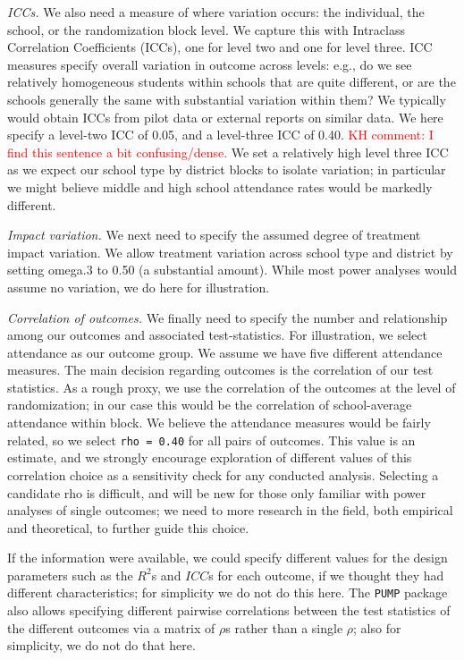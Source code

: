 \documentclass[
]{article}
\begin{document}
\emph{ICCs.} We also need a measure of where variation occurs: the
individual, the school, or the randomization block level. We capture
this with Intraclass Correlation Coefficients (ICCs), one for level two
and one for level three. ICC measures specify overall variation in
outcome across levels: e.g., do we see relatively homogeneous students
within schools that are quite different, or are the schools generally
the same with substantial variation within them? We typically would
obtain ICCs from pilot data or external reports on similar data. We here
specify a level-two ICC of 0.05, and a level-three ICC of 0.40.
\textcolor{red}{KH comment: I find this sentence a bit confusing/dense.}
We set a relatively high level three ICC as we expect our school type by
district blocks to isolate variation; in particular we might believe
middle and high school attendance rates would be markedly different.

\emph{Impact variation.} We next need to specify the assumed degree of
treatment impact variation. We allow treatment variation across school
type and district by setting omega.3 to 0.50 (a substantial amount).
While most power analyses would assume no variation, we do here for
illustration.

\emph{Correlation of outcomes.} We finally need to specify the number
and relationship among our outcomes and associated test-statistics. For
illustration, we select attendance as our outcome group. We assume we
have five different attendance measures. The main decision regarding
outcomes is the correlation of our test statistics. As a rough proxy, we
use the correlation of the outcomes at the level of randomization; in
our case this would be the correlation of school-average attendance
within block. We believe the attendance measures would be fairly
related, so we select \texttt{rho\ =\ 0.40} for all pairs of outcomes.
This value is an estimate, and we strongly encourage exploration of
different values of this correlation choice as a sensitivity check for
any conducted analysis. Selecting a candidate rho is difficult, and will
be new for those only familiar with power analyses of single outcomes;
we need to more research in the field, both empirical and theoretical,
to further guide this choice.

If the information were available, we could specify different values for
the design parameters such as the \(R^2\)s and \(ICC\)s for each
outcome, if we thought they had different characteristics; for
simplicity we do not do this here. The \texttt{PUMP} package also allows
specifying different pairwise correlations between the test statistics
of the different outcomes via a matrix of \(\rho\)s rather than a single
\(\rho\); also for simplicity, we do not do that here.
\end{document}
